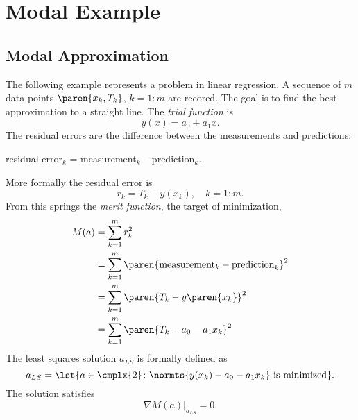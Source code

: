 \chapter{\label{ch:archetype modal}Modal Example}

\section{\label{sec:modal problem}Modal Approximation}  %
The following example represents a problem in linear regression. A sequence of $m$ data points $\paren{x_{k}, T_{k}}$, $k=1\colon m$ are recored. The goal is to find the best approximation to a straight line. The \emph{trial function} is
  \begin{equation*}   %
    y(x) = a_{0} + a_{1} x .
    \label{eq:lr trial}
  \end{equation*}
The residual errors are the difference between the measurements and predictions:\\
\begin{center}
residual error$_{k}$ = measurement$_{k}$ -- prediction$_{k}$.
\end{center} 
 More formally the residual error is
  \begin{equation*}   %
    r_{k} = T_{k} - y(x_{k}), \quad k=1\colon m.
  \end{equation*}
From this springs the \emph{merit function}, the target of minimization,
  \begin{equation}   %
  \begin{split}
    M(a) 
      &= \sum_{k=1}^{m} r_{k}^{2} \\
      &= \sum_{k=1}^{m} \paren{\text{measurement}_{k} - \text{prediction}_{k}}^{2} \\
      &= \sum_{k=1}^{m} \paren{T_{k} - y\paren{x_{k}}}^{2} \\
      &= \sum_{k=1}^{m} \paren{T_{k} - a_{0} - a_{1} x_{k}}^{2}
    \label{eqn:merit}
  \end{split}
  \end{equation}
The least squares solution $a_{LS}$ is formally defined as 
  \begin{equation*}   %
    a_{LS} = \lst{a \in \cmplx{2} \colon \normts{y(x_{k}) - a_{0} - a_{1} x_{k}} \text{ is minimized} }.
  \end{equation*}
The solution satisfies
  \begin{equation}   %
    \nabla M( a )|_{a_{LS}} = 0 .
    \label{eq:gradient lr}
  \end{equation}

